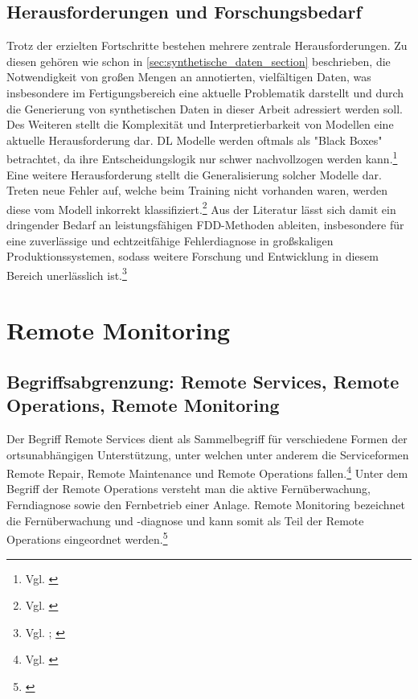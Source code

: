 \subsection{Herausforderungen und Forschungsbedarf}
Trotz der erzielten Fortschritte bestehen mehrere zentrale Herausforderungen. Zu diesen gehören wie schon in \ref{sec:synthetische_daten_section} beschrieben, die Notwendigkeit von großen Mengen an annotierten, vielfältigen Daten, was insbesondere im Fertigungsbereich eine aktuelle Problematik darstellt und durch die Generierung von synthetischen Daten in dieser Arbeit adressiert werden soll. Des Weiteren stellt die Komplexität und Interpretierbarkeit von Modellen eine aktuelle Herausforderung dar. \ac{DL} Modelle werden oftmals als "Black Boxes" betrachtet, da ihre Entscheidungslogik nur schwer nachvollzogen werden kann.\footnote{Vgl. \cite[S. 10]{chai_deep_2021}} Eine weitere Herausforderung stellt die Generalisierung solcher Modelle dar. Treten neue Fehler auf, welche beim Training nicht vorhanden waren, werden diese vom Modell inkorrekt klassifiziert.\footnote{Vgl. \cite[S. 440]{wu_transformer-based_2023}}
Aus der Literatur lässt sich damit ein dringender Bedarf an leistungsfähigen \ac{FDD}-Methoden ableiten, insbesondere für eine zuverlässige und echtzeitfähige Fehlerdiagnose in großskaligen Produktionssystemen, sodass weitere Forschung und Entwicklung in diesem Bereich unerlässlich ist.\footnote{Vgl. \cite[S. 4]{seid_ahmed_advances_2025}; \cite[S. 442]{wu_transformer-based_2023}}


\section{Remote Monitoring}

\subsection{Begriffsabgrenzung: Remote Services, Remote Operations, Remote Monitoring}
Der Begriff Remote Services dient als Sammelbegriff für verschiedene Formen der ortsunabhängigen Unterstützung, unter welchen unter anderem die Serviceformen Remote Repair, Remote Maintenance und Remote Operations fallen.\footnote{Vgl. \cite[S. 5]{holtbrugge_remote_2007}}
Unter dem Begriff der Remote Operations versteht man die aktive Fernüberwachung, Ferndiagnose sowie den Fernbetrieb einer Anlage. Remote Monitoring bezeichnet die Fernüberwachung und -diagnose und kann somit als Teil der Remote Operations eingeordnet werden.\footnote{\cite[S. 592 f.]{vogel-heuser_remote_2024}}

